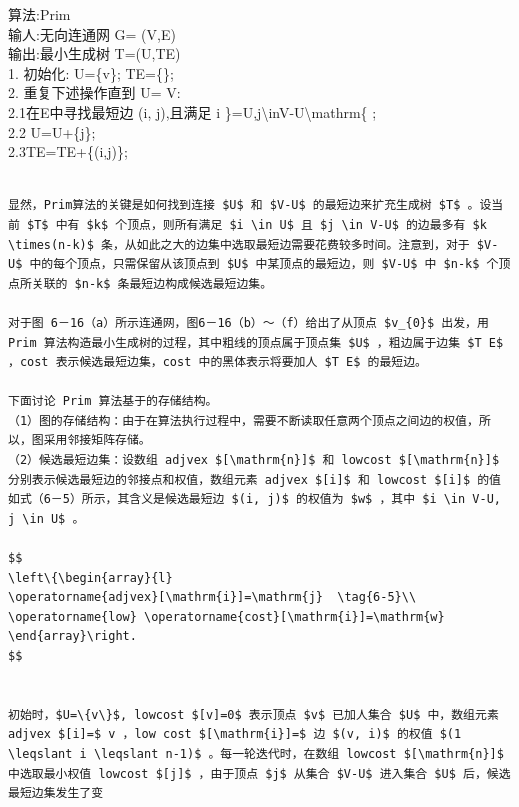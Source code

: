 \documentclass[10pt]{article}
\begin{document}
算法:Prim\\
输人:无向连通网 G= (V,E)\\
输出:最小生成树 T=(U,TE)\\
1. 初始化: U=\{v\}; TE=\{\};\\
2. 重复下述操作直到 U= V:\\
2.1在E中寻找最短边 (i, j),且满足 i \}=U,j\textbackslash inV-U\textbackslash mathrm\{ ;\\
2.2 U=U+\{j\};\\
2.3TE=TE+\{(i,j)\};

\begin{verbatim}

显然，Prim算法的关键是如何找到连接 $U$ 和 $V-U$ 的最短边来扩充生成树 $T$ 。设当前 $T$ 中有 $k$ 个顶点，则所有满足 $i \in U$ 且 $j \in V-U$ 的边最多有 $k \times(n-k)$ 条，从如此之大的边集中选取最短边需要花费较多时间。注意到，对于 $V-U$ 中的每个顶点，只需保留从该顶点到 $U$ 中某顶点的最短边，则 $V-U$ 中 $n-k$ 个顶点所关联的 $n-k$ 条最短边构成候选最短边集。

对于图 6－16（a）所示连通网，图6－16（b）～（f）给出了从顶点 $v_{0}$ 出发，用 Prim 算法构造最小生成树的过程，其中粗线的顶点属于顶点集 $U$ ，粗边属于边集 $T E$ ，cost 表示候选最短边集，cost 中的黑体表示将要加人 $T E$ 的最短边。

下面讨论 Prim 算法基于的存储结构。
（1）图的存储结构：由于在算法执行过程中，需要不断读取任意两个顶点之间边的权值，所以，图采用邻接矩阵存储。
（2）候选最短边集：设数组 adjvex $[\mathrm{n}]$ 和 lowcost $[\mathrm{n}]$ 分别表示候选最短边的邻接点和权值，数组元素 adjvex $[i]$ 和 lowcost $[i]$ 的值如式（6－5）所示，其含义是候选最短边 $(i, j)$ 的权值为 $w$ ，其中 $i \in V-U, j \in U$ 。

$$
\left\{\begin{array}{l}
\operatorname{adjvex}[\mathrm{i}]=\mathrm{j}  \tag{6-5}\\
\operatorname{low} \operatorname{cost}[\mathrm{i}]=\mathrm{w}
\end{array}\right.
$$


初始时，$U=\{v\}$, lowcost $[v]=0$ 表示顶点 $v$ 已加人集合 $U$ 中，数组元素 adjvex $[i]=$ v ，low cost $[\mathrm{i}]=$ 边 $(v, i)$ 的权值 $(1 \leqslant i \leqslant n-1)$ 。每一轮迭代时，在数组 lowcost $[\mathrm{n}]$ 中选取最小权值 lowcost $[j]$ ，由于顶点 $j$ 从集合 $V-U$ 进入集合 $U$ 后，候选最短边集发生了变


\end{verbatim}
\end{document}
